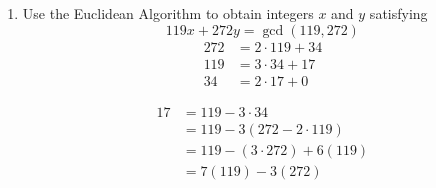 \documentclass[letterpaper]{article}
\begin{document}
\begin{enumerate}
	\item Use the Euclidean Algorithm to obtain integers $x$ and $y$ satisfying
	\[
		119x+272y=\gcd(119,272)
	\]
	\begin{align*}
		272 & = 2\cdot119+34 \\
		119 & = 3\cdot34+17 \\
		34 & = 2\cdot17+0 
	\end{align*}
	\begin{center}
	\end{center}
	\begin{align*}
		17 & = 119-3\cdot34 \\
		& = 119-3(272-2\cdot119) \\
		& = 119-(3\cdot272)+6(119) \\
		& = 7(119)-3(272)
	\end{align*}
	\begin{center}
	\end{center}
\end{enumerate}
\end{document}
